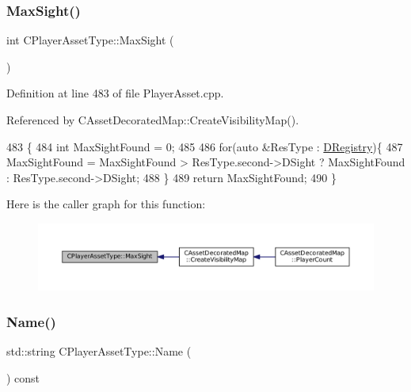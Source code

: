 \subsubsection{\texorpdfstring{Max\+Sight()}{MaxSight()}}
{\footnotesize\ttfamily int C\+Player\+Asset\+Type\+::\+Max\+Sight (\begin{DoxyParamCaption}{ }\end{DoxyParamCaption})\hspace{0.3cm}{\ttfamily [static]}}



Definition at line 483 of file Player\+Asset.\+cpp.



Referenced by C\+Asset\+Decorated\+Map\+::\+Create\+Visibility\+Map().


\begin{DoxyCode}
483                               \{
484     \textcolor{keywordtype}{int} MaxSightFound = 0;
485     
486     \textcolor{keywordflow}{for}(\textcolor{keyword}{auto} &ResType : \hyperlink{classCPlayerAssetType_a24f4ccd06fbddacc936e31a2f1f12ed5}{DRegistry})\{
487         MaxSightFound = MaxSightFound > ResType.second->DSight ? MaxSightFound : ResType.second->DSight;
488     \}
489     \textcolor{keywordflow}{return} MaxSightFound;
490 \}
\end{DoxyCode}
Here is the caller graph for this function\+:\nopagebreak
\begin{figure}[H]
\begin{center}
\leavevmode
\includegraphics[width=350pt]{classCPlayerAssetType_a1c1648ef0fdd2d112508c2ef9b7b70d1_icgraph}
\end{center}
\end{figure}
\hypertarget{classCPlayerAssetType_afd1b77119e34b459918551a08012ed35}{}\label{classCPlayerAssetType_afd1b77119e34b459918551a08012ed35} 
\subsubsection{\texorpdfstring{Name()}{Name()}}
{\footnotesize\ttfamily std\+::string C\+Player\+Asset\+Type\+::\+Name (\begin{DoxyParamCaption}{ }\end{DoxyParamCaption}) const\hspace{0.3cm}{\ttfamily [inline]}}



